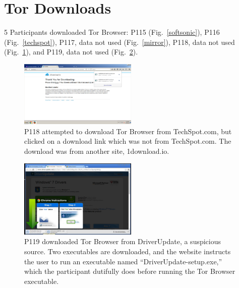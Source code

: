 \documentclass[USenglish,oneside,twocolumn]{article}
\begin{document}
\section{Tor Downloads}
\label{tor-downloads}

5 Participants downloaded Tor Browser:  P115 (Fig.~\ref{softsonic}), P116 (Fig.~\ref{techspot}), P117, data not used (Fig.~\ref{mirror}), P118, data not used (Fig.~\ref{downloadio}), and P119, data not used (Fig.~\ref{driverupdate}).


\begin{figure}[h]
\includegraphics[width=0.5\textwidth]{../experiment/processing/bad-participants/X10-20160323-132505-1downloadio.png}
\caption{P118 attempted to download Tor Browser from TechSpot.com, but clicked on
a download link which was not from TechSpot.com. The download was from another site, 1download.io.}
\label{downloadio}
\end{figure} 

\begin{figure}[h]
\includegraphics[width=0.5\textwidth]{../experiment/processing/bad-participants/X28-20160328-134111-driverupdate.png}
\caption{P119 downloaded Tor Browser from DriverUpdate, a suspicious source. Two executables
are downloaded, and the website instructs the user to run an executable named ``DriverUpdate-setup.exe,'' which the
participant dutifully does before running the Tor Browser executable.}
\label{driverupdate}
\end{figure} 
\end{document}

